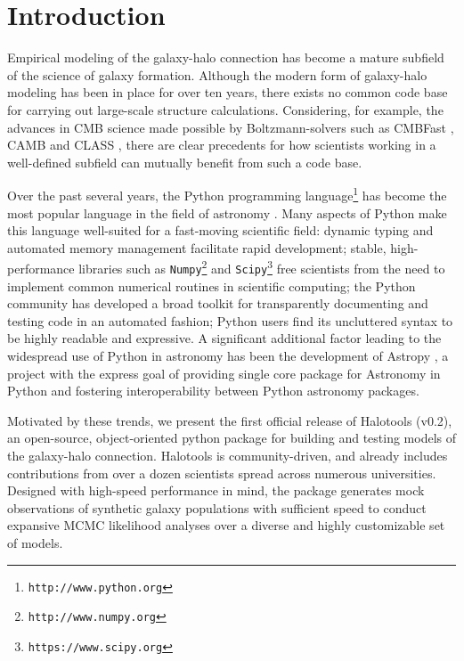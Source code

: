 \documentclass[twocolumn, tighten]{aastex6}
\begin{document}
\maketitle

\section{Introduction}
\label{section:introduction}

Empirical modeling of the galaxy-halo connection has become a mature subfield of the science of galaxy formation. Although the modern form of galaxy-halo modeling has been in place for over ten years, there exists no common code base for carrying out large-scale structure calculations. Considering, for example, the advances in CMB science made possible by Boltzmann-solvers such as CMBFast \citep{cmbfast}, CAMB \citep{camb} and CLASS \citep{class}, there are clear precedents for how scientists working in a well-defined subfield can mutually benefit from such a code base. 

Over the past several years, the Python programming language\footnote{{\tt http://www.python.org}} has become the most popular language in the field of astronomy \citep{momcheva_tollerud15}. Many aspects of Python make this language well-suited for a fast-moving scientific field: dynamic typing and automated memory management facilitate rapid development; stable, high-performance libraries such as {\tt Numpy}\footnote{{\tt http://www.numpy.org}}\citep{numpy_array} and {\tt Scipy}\footnote{{\tt https://www.scipy.org}}\citep{scipy} free scientists from the need to implement common numerical routines in scientific computing; the Python community has developed a broad toolkit for transparently documenting and testing code in an automated fashion; Python users find its uncluttered syntax to be highly readable and expressive. A significant additional factor leading to the widespread use of Python in astronomy has been the development of  Astropy \citep{astropy}, a project with the express goal of providing single core package for Astronomy in Python and fostering interoperability between Python astronomy packages.

Motivated by these trends, we present the first official release of Halotools (v0.2), an open-source, object-oriented python package for building and testing models of the galaxy-halo connection. Halotools is community-driven, and already includes contributions from over a dozen scientists spread across numerous universities. Designed with high-speed performance in mind, the package generates mock observations of synthetic galaxy populations with sufficient speed to conduct expansive MCMC likelihood analyses over a diverse and highly customizable set of models.
\end{document}
